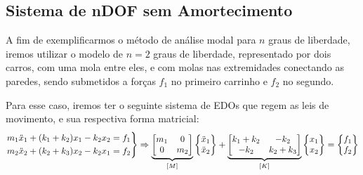 \documentclass{article}
\newenvironment{rcases}
  {\left.\begin{aligned}}
  {\end{aligned}\right\rbrace}
\begin{document}
\newpage
\subsection{Sistema de nDOF sem Amortecimento}
A fim de exemplificarmos o método de análise modal para $n$ graus de liberdade, iremos utilizar o modelo de $n=2$ graus de liberdade, representado por dois carros, com uma mola entre eles, e com molas nas extremidades conectando as paredes, sendo submetidos a forças $f_1$ no primeiro carrinho e $f_2$ no segundo.

Para esse caso, iremos ter o seguinte sistema de EDOs que regem as leis de movimento, e sua respectiva forma matricial:
\begin{align*}
    \begin{rcases}
        m_1\ddot x_1 + (k_1 + k_2)x_1 - k_2x_2 = f_1 \\
        m_2\ddot x_2 + (k_2 + k_3)x_2 - k_2x_1 = f_2
    \end{rcases} \Rightarrow \underbrace{\begin{bmatrix}
                                                 m_1 & 0   \\
                                                 0   & m_2
                                             \end{bmatrix}}_{[M]} \left\{\begin{matrix}
                                                                         \ddot x_1 \\ \ddot x_2
                                                                     \end{matrix}\right\}+
    \underbrace{\begin{bmatrix}
                        k_1 + k_2 & -k_2    \\
                        -k_2      & k_2+k_3
                    \end{bmatrix}}_{[K]}\left\{\begin{matrix}
                                               x_1 \\  x_2
                                           \end{matrix}\right\} = \left\{\begin{matrix}
                                                                             f_1 \\ f_2
                                                                         \end{matrix}\right\}
\end{align*}
\end{document}
